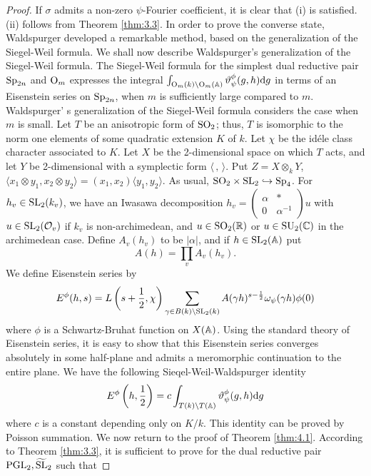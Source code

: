\begin{proof}
If $\sigma$ admits a non-zero $\psi$-Fourier coefficient, it is clear that (i) is satisfied.
(ii) follows from Theorem \ref{thm:3.3}.
In order to prove the converse state, Waldspurger developed a remarkable method, based on the generalization of the Siegel-Weil formula.
We shall now describe Waldspurger's generalization of the Siegel-Weil formula.
The Siegel-Weil formula for the simplest dual reductive pair $\mathrm{Sp}_{2n}$ and $\mathrm{O}_{m}$ expresses the integral $\int_{\mathrm{O}_{m}(k) \backslash \mathrm{O}_{m}(\mathbb{A})} \vartheta_\psi^\phi(g, h) \mathrm{d} g$
in terms of an Eisenstein series on $\mathrm{Sp}_{2n}$, when $m$ is sufficiently large compared to $m$.
Waldspurger' s generalization of the Siegel-Weil formula considers the case when $m$ is small.
Let $T$ be an anisotropic form of $\mathrm{SO}_2$; thus, $T$ is isomorphic to the norm one elements of some quadratic extension $K$ of $k$.
Let $\chi$ be the id\'ele class character associated to $K$. 
Let $X$ be the 2-dimensional space on which $T$ acts, and let $Y$ be 2-dimensional with a symplectic form $\langle \,,\,\rangle$.
Put $Z = X \otimes_k Y$, $\langle x_1 \otimes y_1, x_2 \otimes y_2 \rangle = (x_1, x_2) \langle y_1, y_2 \rangle$.
As usual, $\mathrm{SO}_2 \times \mathrm{SL}_2 \hookrightarrow \mathrm{Sp}_4$.
For $h_v \in \mathrm{SL}_2(k_v)$, we have an Iwasawa decomposition $h_v = \left(\begin{smallmatrix}
    \alpha & * \\ 0 & \alpha^{-1}
\end{smallmatrix}\right) u$ with $u \in \mathrm{SL}_2(\mathcal{O}_v)$ if $k_v$ is non-archimedean, and $u \in \mathrm{SO}_2(\mathbb{R})$ or $u \in \mathrm{SU}_2(\mathbb{C})$ in the archimedean case.
Define $A_v(h_v)$ to be $|\alpha|$, and if $h \in \mathrm{SL}_2(\mathbb{A})$ put
\[
A(h) = \prod_v A_v(h_v).
\]
We define Eisenstein series by
\[
E^\phi(h, s) = L\left(s + \frac{1}{2}, \chi\right) \sum_{\gamma \in B(k) \backslash \mathrm{SL}_2(k)} A(\gamma h)^{s - \frac{1}{2}}\omega_\psi(\gamma h)\phi(0)
\]
where $\phi$ is a Schwartz-Bruhat function on $X(\mathbb{A})$.
Using the standard theory of Eisenstein series, it is easy to show that this Eisenstein series converges absolutely in some half-plane and admits a meromorphic continuation to the entire plane.
We have the following Sieqel-Weil-Waldspurger identity
\[
E^\phi\left(h, \frac{1}{2}\right) = c \int_{T(k) \backslash T(\mathbb{A})} \vartheta_\psi^\phi(g, h) \mathrm{d} g
\]
where $c$ is a constant depending only on $K/k$. This identity can be proved by Poisson summation.
We now return to the proof of Theorem \ref{thm:4.1}.
According to Theorem \ref{thm:3.3}, it is sufficient to prove for the dual reductive pair $\mathrm{PGL}_2, \widetilde{\mathrm{SL}}_2$ such that

\end{proof}
